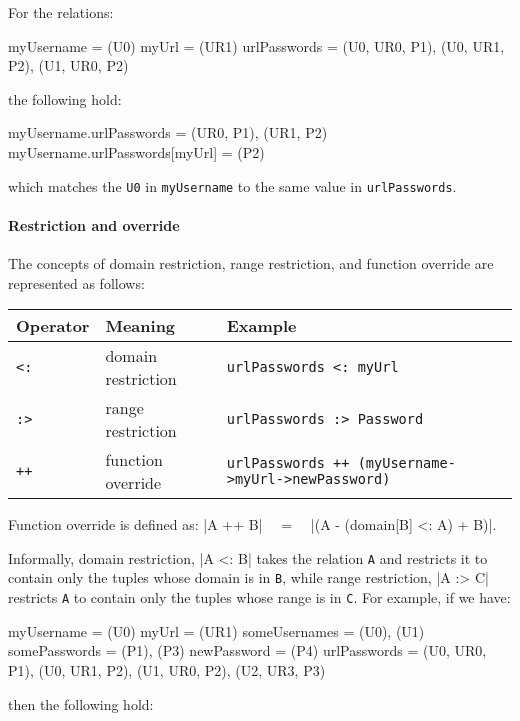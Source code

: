 For the relations:

\begin{alloy}
  myUsername = {(U0)}
  myUrl = {(UR1)}
  urlPasswords = {(U0, UR0, P1), (U0, UR1, P2), (U1, UR0, P2)}
\end{alloy}

the following hold:

\begin{alloy}
  myUsername.urlPasswords = {(UR0, P1), (UR1, P2)}
  myUsername.urlPasswords[myUrl] = {(P2)}
\end{alloy}

which matches the \texttt{U0} in \texttt{myUsername} to the same value in \texttt{urlPasswords}. 

\paragraph{Restriction and override}
The concepts of domain restriction, range restriction, and function override are represented as follows:
%
\begin{center}
\begin{tabular}{lll}
\toprule
 Operator & Meaning & Example\\
\midrule
 \texttt{<:} & domain restriction & \texttt{urlPasswords <: myUrl}\\
 \texttt{:>} & range restriction  & \texttt{urlPasswords :> Password}\\
 \texttt{++} & function override  & \texttt{urlPasswords ++ (myUsername->myUrl->newPassword)}\\
\bottomrule
\end{tabular}
\end{center}

Function override is defined as: \A|A ++ B|~~ = ~~\A|(A - (domain[B] <: A) + B)|.

Informally, domain restriction, \A|A <: B| takes the relation \texttt{A} and restricts it to contain only the tuples whose domain is in \texttt{B}, while range restriction, \A|A :> C| restricts \texttt{A} to contain only the tuples whose range is in \texttt{C}. For example, if we have:

\begin{alloy}
  myUsername = {(U0)}
  myUrl = {(UR1)}
  someUsernames = {(U0), (U1)}
  somePasswords = {(P1), (P3)}
  newPassword = {(P4)}
  urlPasswords = {(U0, UR0, P1), (U0, UR1, P2), (U1, UR0, P2), (U2, UR3, P3)}
\end{alloy}

then the following hold:


